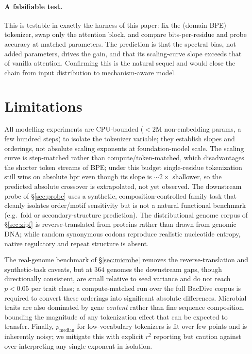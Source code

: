 \documentclass[11pt]{article}
\begin{document}
\paragraph{A falsifiable test.} This is testable in exactly the harness of this
paper: fix the (domain BPE) tokenizer, swap only the attention block, and
compare bits-per-residue and probe accuracy at matched parameters. The
prediction is that the spectral bias, not added parameters, drives the gain, and
that its scaling-curve slope exceeds that of vanilla attention. Confirming this
is the natural sequel and would close the chain from input distribution to
mechanism-aware model.

\section{Limitations}
\label{sec:limitations}
All modelling experiments are CPU-bounded ($< 2$M non-embedding params, a few
hundred steps) to isolate the tokenizer variable; they establish slopes and
orderings, not absolute scaling exponents at foundation-model scale. The scaling
curve is step-matched rather than compute/token-matched, which disadvantages the
shorter token streams of BPE; under this budget single-residue tokenization
still wins on absolute bpr even though its slope is ${\sim}2\times$ shallower, so
the predicted absolute crossover is extrapolated, not yet observed. The
downstream probe of \S\ref{sec:probe} uses a synthetic, composition-controlled
family task that cleanly isolates order/motif sensitivity but is not a natural
functional benchmark (e.g.\ fold or secondary-structure prediction). The
distributional genome corpus of \S\ref{sec:zipf} is reverse-translated from
proteins rather than drawn from genomic DNA; while random synonymous codons
reproduce realistic nucleotide entropy, native regulatory and repeat structure
is absent.

The real-genome benchmark of \S\ref{sec:microbe} removes the
reverse-translation and synthetic-task caveats, but at $364$ genomes the
downstream gaps, though directionally consistent, are small relative to seed
variance and do not reach $p<0.05$ per trait class; a compute-matched run over
the full BacDive corpus is required to convert these orderings into significant
absolute differences. Microbial traits are also dominated by gene \emph{content}
rather than fine sequence composition, bounding the magnitude of any
tokenization effect that can be expected to transfer. Finally,
$p_\text{median}$ for low-vocabulary tokenizers is fit over few points and is
inherently noisy; we mitigate this with explicit $r^2$ reporting but caution
against over-interpreting any single exponent in isolation.
\end{document}
